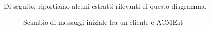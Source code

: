 \documentclass[11pt]{article} %
\begin{document}
Di seguito, riportiamo alcuni estratti rilevanti di questo diagramma.

\begin{figure}[!ht]
\begin{center}
\caption{Scambio di messaggi iniziale fra un cliente e ACMEat}
\end{center}
\end{figure}
\end{document}
